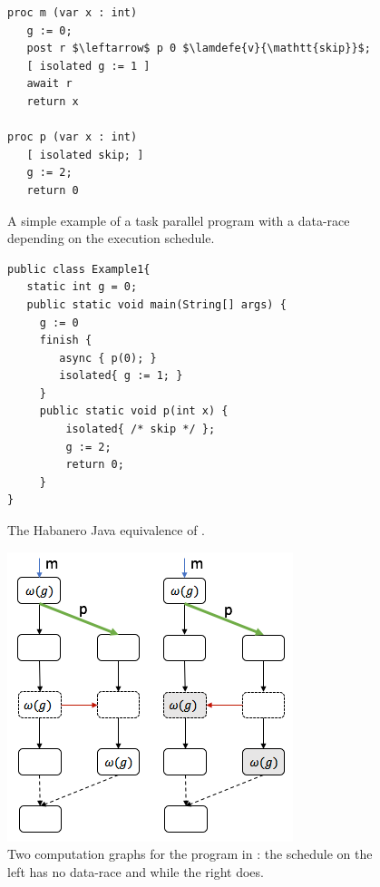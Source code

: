 \begin{figure}
  \begin{center}
    \begin{lstlisting}[mathescape=true]
proc m (var x : int)
   g := 0;
   post r $\leftarrow$ p 0 $\lamdefe{v}{\mathtt{skip}}$;
   [ isolated g := 1 ]
   await r
   return x
    
proc p (var x : int)
   [ isolated skip; ]
   g := 2;
   return 0
\end{lstlisting}
  \end{center}
  \caption{A simple example of a task parallel program with a data-race depending on the execution schedule.}
  \label{fig:example}
\end{figure}


\begin{figure}
  \begin{center}
\begin{lstlisting}
public class Example1{
   static int g = 0;
   public static void main(String[] args) {
     g := 0
     finish {
        async { p(0); }
        isolated{ g := 1; }
     }
     public static void p(int x) {
         isolated{ /* skip */ };
         g := 2;
         return 0;
     }
}
\end{lstlisting}
  \end{center}
  \caption{The Habanero Java equivalence of .}
  \label{fig:example-hj}
\end{figure}



\begin{figure}
  \begin{center}
     \includegraphics[scale=0.7]{../figs/example-cg}
  \caption{Two computation graphs for the program in : the schedule on the left has no data-race and while the right does.}
   \label{fig:example-cg}
   \end{center}
\end{figure}

